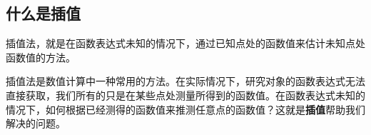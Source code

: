 \subsection{什么是插值}
插值法，就是在函数表达式未知的情况下，通过已知点处的函数值来估计未知点处函数值的方法。

插值法是数值计算中一种常用的方法。在实际情况下，研究对象的函数表达式无法直接获取，我们所有的只是在某些点处测量所得到的函数值。在函数表达式未知的情况下，如何根据已经测得的函数值来推测任意点的函数值？这就是\textbf{插值}帮助我们解决的问题。
